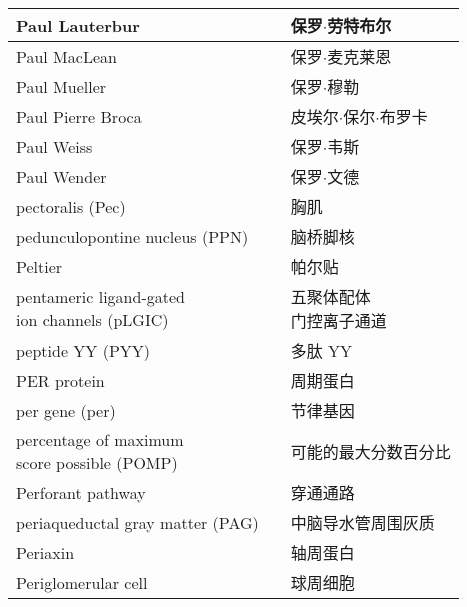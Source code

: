 \begin{longtable}{lll}
	\midrule
	Paul Lauterbur     && 保罗$\cdot$劳特布尔  \\
	
	\midrule
	Paul MacLean     && 保罗$\cdot$麦克莱恩  \\
	
	\midrule
	Paul Mueller     && 保罗$\cdot$穆勒  \\
	
	\midrule
	Paul Pierre Broca     && 皮埃尔$\cdot$保尔$\cdot$布罗卡  \\
	
	\midrule
	Paul Weiss     && 保罗$\cdot$韦斯  \\
	
	\midrule
	Paul Wender     && 保罗$\cdot$文德  \\
	
	\midrule
	pectoralis (Pec)    && 胸肌   \\
	
	\midrule
	pedunculopontine nucleus (PPN)     && 脑桥脚核   \\
	
	\midrule
	Peltier     && 帕尔贴   \\
	
	\midrule
	\makecell[l]{pentameric ligand-gated \\ion channels (pLGIC)}     && \makecell[l]{五聚体配体\\门控离子通道}   \\
	
	\midrule
	peptide YY (PYY)     && 多肽 YY   \\
	
	\midrule
	PER protein     && 周期蛋白   \\
	
	\midrule
	per gene (per)     && 节律基因   \\
	
	\midrule
	\makecell[l]{percentage of maximum \\score possible (POMP)}     && 可能的最大分数百分比   \\
	
	\midrule
	Perforant pathway     && 穿通通路   \\
	
	\midrule
	periaqueductal gray matter (PAG)    && 中脑导水管周围灰质   \\
	
	\midrule
	Periaxin    && 轴周蛋白   \\
	
	\midrule
	Periglomerular cell     && 球周细胞   \\
	

\end{longtable}
